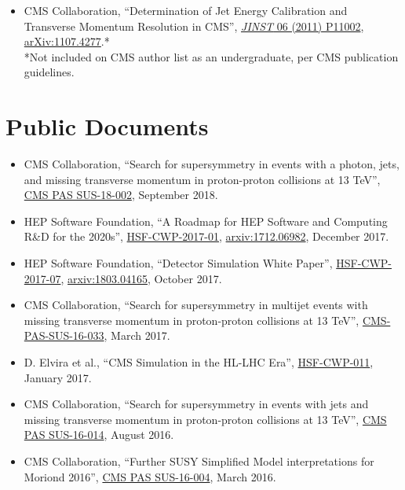 \begin{itemize}[leftmargin=12pt]
\ifdefined\longerflag
\item CMS Collaboration, ``Determination of Jet Energy Calibration and Transverse Momentum Resolution in CMS'', \href{http://dx.doi.org/10.1088/1748-0221/6/11/P11002}{\emph{JINST} 06 (2011) P11002}, \href{http://arxiv.org/abs/1107.4277}{arXiv:1107.4277}.*\\
\small{*Not included on CMS author list as an undergraduate, per CMS publication guidelines.}
\fi
\end{itemize}

\section{Public Documents}
\begin{itemize}[leftmargin=12pt]
\ifdefined\longestflag
\item CMS Collaboration, ``Search for supersymmetry in events with a photon, jets, and missing transverse momentum in proton-proton collisions at 13 TeV'', \href{https://cds.cern.ch/record/2638619}{CMS PAS SUS-18-002}, September 2018.
\fi
\item HEP Software Foundation, ``A Roadmap for HEP Software and Computing R\&D for the 2020s'', \href{http://hepsoftwarefoundation.org/activities/cwp.html}{HSF-CWP-2017-01}, \href{https://arxiv.org/abs/1712.06982}{arxiv:1712.06982}, December 2017.
\ifdefined\longflag
\item HEP Software Foundation, ``Detector Simulation White Paper'', \href{http://hepsoftwarefoundation.org/activities/cwp.html}{HSF-CWP-2017-07}, \href{https://arxiv.org/abs/1803.04165}{arxiv:1803.04165}, October 2017.
\fi
\ifdefined\longestflag
\item CMS Collaboration, ``Search for supersymmetry in multijet events with missing transverse momentum in proton-proton collisions at 13 TeV'', \href{https://cds.cern.ch/record/2256850}{CMS-PAS-SUS-16-033}, March 2017.
\fi
\ifdefined\longflag
\item D. Elvira et al., ``CMS Simulation in the HL-LHC Era'', \href{http://hepsoftwarefoundation.org/cwp-whitepapers.html}{HSF-CWP-011}, January 2017.
\fi
\ifdefined\longestflag
\item CMS Collaboration, ``Search for supersymmetry in events with jets and missing transverse momentum in proton-proton collisions at 13 TeV'', \href{http://cds.cern.ch/record/2205158}{CMS PAS SUS-16-014}, August 2016.
\item CMS Collaboration, ``Further SUSY Simplified Model interpretations for Moriond 2016'', \href{http://cds.cern.ch/record/2140312}{CMS PAS SUS-16-004}, March 2016.

\end{itemize}
